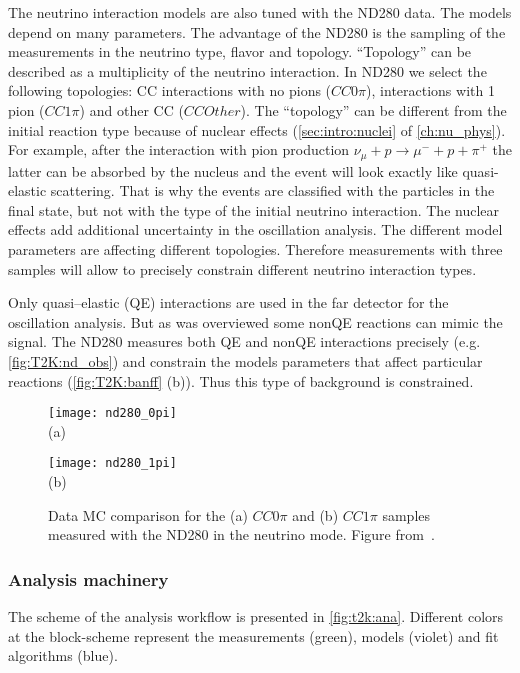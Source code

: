 \documentclass[../main.tex]{subfiles}
\begin{document}
The neutrino interaction models are also tuned with the ND280 data. The models depend on many parameters. The advantage of the ND280 is the sampling of the measurements in the neutrino type, flavor and topology. ``Topology'' can be described as a multiplicity of the neutrino interaction. In ND280 we select the following topologies: CC interactions with no pions ($CC0\pi$), interactions with 1 pion ($CC1\pi$) and other CC ($CCOther$). The ``topology'' can be different from the initial reaction type because of nuclear effects (\autoref{sec:intro:nuclei} of \autoref{ch:nu_phys}). For example, after the interaction with pion production $\nu_\mu+p\to\mu^-+p+\pi^+$ the latter can be absorbed by the nucleus and the event will look exactly like quasi-elastic scattering. That is why the events are classified with the particles in the final state, but not with the type of the initial neutrino interaction. The nuclear effects add additional uncertainty in the oscillation analysis. The different model parameters are affecting different topologies. Therefore measurements with three samples will allow to precisely constrain different neutrino interaction types.

Only quasi--elastic (QE) interactions are used in the far detector for the oscillation analysis. But as was overviewed some nonQE reactions can mimic the signal. The ND280 measures both QE and nonQE interactions precisely (e.g. \autoref{fig:T2K:nd_obs}) and constrain the models parameters that affect particular reactions (\autoref{fig:T2K:banff} (b)). Thus this type of background is constrained.

\begin{figure}[!ht]
  \centering
  \begin{minipage}{0.49\linewidth}
    \centering
    \texttt{[image: nd280\_0pi]} \\ (a)
  \end{minipage}
  \begin{minipage}{0.49\linewidth}
    \centering
    \texttt{[image: nd280\_1pi]} \\ (b)
  \end{minipage}
    \caption{Data MC comparison for the (a) $CC0\pi$ and (b) $CC1\pi$ samples measured with the ND280 in the neutrino mode. Figure from~\cite{Abe2017}.}
    \label{fig:T2K:nd_obs}
\end{figure}

\subsubsection{Analysis machinery}
The scheme of the analysis workflow is presented in \autoref{fig:t2k:ana}. Different colors at the block-scheme represent the measurements (green), models (violet) and fit algorithms (blue).
\end{document}
